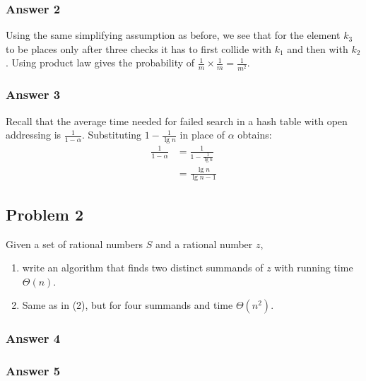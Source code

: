 \documentclass[11pt]{article}
\begin{document}
\subsubsection{Answer 2}
\label{sec-1-1-2}
Using the same simplifying assumption as before, we see that for the element
$k_3$ to be places only after three checks it has to first collide with
$k_1$ and then with $k_2$.  Using product law gives the probability of
$\frac{1}{m}\times\frac{1}{m}=\frac{1}{m^2}$.

\subsubsection{Answer 3}
\label{sec-1-1-3}
Recall that the average time needed for failed search in a hash table with
open addressing is $\frac{1}{1-\alpha}$.  Substituting $1-\frac{1}{\lg n}$
in place of $\alpha$ obtains:
\begin{align*}
  \frac{1}{1-\alpha} &= \frac{1}{1-\frac{1}{\lg n}} \\
  &= \frac{\lg n}{\lg n - 1}
\end{align*}

\subsection{Problem 2}
\label{sec-1-2}
Given a set of rational numbers $S$ and a rational number $z$,
\begin{enumerate}
\item write an algorithm that finds two distinct summands of $z$ with running
time $\Theta(n)$.
\item Same as in (2), but for four summands and time $\Theta(n^2)$.
\end{enumerate}

\subsubsection{Answer 4}
\label{sec-1-2-1}

\subsubsection{Answer 5}
\label{sec-1-2-2}
\end{document}
